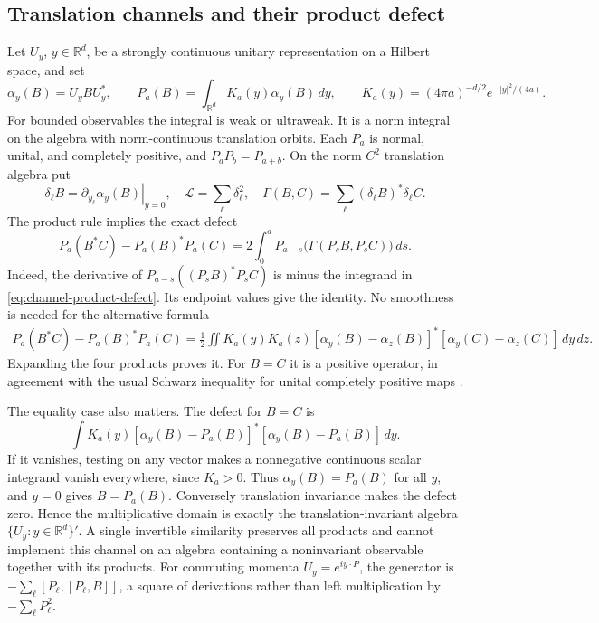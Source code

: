 \documentclass[11pt]{article}
\numberwithin{equation}{section}
\theoremstyle{definition}
\theoremstyle{remark}
\begin{document}
\subsection{Translation channels and their product defect}
Let $U_y$, $y\in\mathbb R^d$, be a strongly continuous unitary
representation on a Hilbert space, and set
\begin{equation}\label{eq:gaussian-channel}
 \alpha_y(B)=U_yBU_y^*,\qquad
 P_a(B)=\int_{\mathbb R^d}K_a(y)\alpha_y(B)\,dy,\qquad
 K_a(y)=(4\pi a)^{-d/2}e^{-|y|^2/(4a)}.
\end{equation}
For bounded observables the integral is weak or ultraweak.  It is a
norm integral on the algebra with norm-continuous translation orbits.
Each $P_a$ is normal, unital, and completely positive, and
$P_aP_b=P_{a+b}$.  On the norm $C^2$ translation algebra put
\begin{equation}
 \delta_\ell B=\left.\partial_{y_\ell}\alpha_y(B)\right|_{y=0},
 \quad \mathcal L=\sum_\ell\delta_\ell^2,
 \quad \Gamma(B,C)=\sum_\ell(\delta_\ell B)^*\delta_\ell C.
\end{equation}
The product rule implies the exact defect
\begin{equation}\label{eq:channel-product-defect}
 P_a(B^*C)-P_a(B)^*P_a(C)
 =2\int_0^aP_{a-s}\bigl(\Gamma(P_sB,P_sC)\bigr)\,ds.
\end{equation}
Indeed, the derivative of
$P_{a-s}((P_sB)^*P_sC)$ is minus the integrand in
\eqref{eq:channel-product-defect}.  Its endpoint values give the
identity.  No smoothness is needed for the alternative formula
\begin{equation}\label{eq:channel-double-square}
 \begin{split}
 P_a(B^*C)-P_a(B)^*P_a(C)
 =\frac12\iint K_a(y)K_a(z)
 [\alpha_y(B)-\alpha_z(B)]^*
 [\alpha_y(C)-\alpha_z(C)]\,dy\,dz .
 \end{split}
\end{equation}
Expanding the four products proves it.  For $B=C$ it is a positive
operator, in agreement with the usual Schwarz inequality for unital
completely positive maps \cite{choi}.

The equality case also matters.  The defect for $B=C$ is
\[
 \int K_a(y)[\alpha_y(B)-P_a(B)]^*
                   [\alpha_y(B)-P_a(B)]\,dy.
\]
If it vanishes, testing on any vector makes a nonnegative continuous
scalar integrand vanish everywhere, since $K_a>0$.  Thus
$\alpha_y(B)=P_a(B)$ for all $y$, and $y=0$ gives $B=P_a(B)$.
Conversely translation invariance makes the defect zero.  Hence the
multiplicative domain is exactly the translation-invariant algebra
$\{U_y:y\in\mathbb R^d\}'$.  A single invertible similarity preserves
all products and cannot implement this channel on an algebra containing
a noninvariant observable together with its products.  For commuting
momenta $U_y=e^{iy\cdot P}$, the generator is
$-\sum_\ell[P_\ell,[P_\ell,B]]$, a square of derivations rather than
left multiplication by $-\sum_\ell P_\ell^2$.
\end{document}
